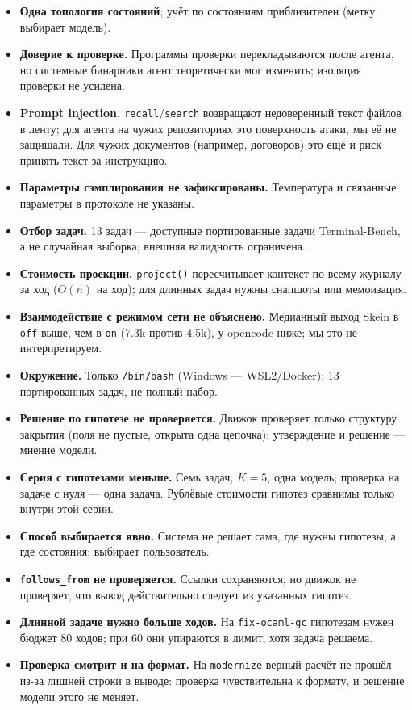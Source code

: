 \documentclass[11pt,a4paper]{article}
\begin{document}
\begin{itemize}[leftmargin=1.4em,itemsep=0.2em]
  через \texttt{bash}, поэтому цену повторного чтения мы не выделяем.
  \item \textbf{Одна топология состояний}; учёт по состояниям приблизителен (метку
  выбирает модель).
  \item \textbf{Доверие к проверке.} Программы проверки перекладываются после агента, но
  системные бинарники агент теоретически мог изменить; изоляция проверки не усилена.
  \item \textbf{Prompt injection.} \texttt{recall}/\texttt{search} возвращают недоверенный
  текст файлов в ленту; для агента на чужих репозиториях это поверхность атаки, мы её не
  защищали. Для чужих документов (например, договоров) это ещё и риск принять текст за
  инструкцию.
  \item \textbf{Параметры сэмплирования не зафиксированы.} Температура и связанные
  параметры в протоколе не указаны.
  \item \textbf{Отбор задач.} 13 задач --- доступные портированные задачи Terminal-Bench,
  а не случайная выборка; внешняя валидность ограничена.
  \item \textbf{Стоимость проекции.} \texttt{project()} пересчитывает контекст по всему
  журналу за ход ($O(n)$ на ход); для длинных задач нужны снапшоты или мемоизация.
  \item \textbf{Взаимодействие с режимом сети не объяснено.} Медианный выход Skein в
  \texttt{off} выше, чем в \texttt{on} (7.3k против 4.5k), у opencode ниже; мы это не
  интерпретируем.
  \item \textbf{Окружение.} Только \texttt{/bin/bash} (Windows --- WSL2/Docker);
  13 портированных задач, не полный набор.
  \item \textbf{Решение по гипотезе не проверяется.} Движок проверяет только структуру закрытия
  (поля не пустые, открыта одна цепочка); утверждение и решение --- мнение модели.
  \item \textbf{Серия с гипотезами меньше.} Семь задач, $K=5$, одна модель; проверка на задаче
  с нуля --- одна задача. Рублёвые стоимости гипотез сравнимы только внутри этой серии.
  \item \textbf{Способ выбирается явно.} Система не решает сама, где нужны гипотезы, а где
  состояния; выбирает пользователь.
  \item \textbf{\texttt{follows\_from} не проверяется.} Ссылки сохраняются, но движок не
  проверяет, что вывод действительно следует из указанных гипотез.
  \item \textbf{Длинной задаче нужно больше ходов.} На \texttt{fix-ocaml-gc} гипотезам нужен
  бюджет 80 ходов; при 60 они упираются в лимит, хотя задача решаема.
  \item \textbf{Проверка смотрит и на формат.} На \texttt{modernize} верный расчёт не прошёл
  из-за лишней строки в выводе: проверка чувствительна к формату, и решение модели этого не
  меняет.
\end{itemize}
\end{document}
